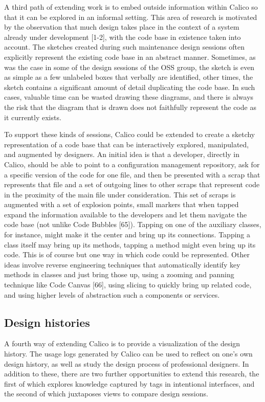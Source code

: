 \documentclass[12pt,fleqn]{ucithesis}
\begin{document}
A third path of extending work is to embed outside information within Calico so that it can be explored in an informal setting. This area of research is motivated by the observation that much design takes place in the context of a system already under development [1-2], with the code base in existence taken into account. The sketches created during such maintenance design sessions often explicitly represent the existing code base in an abstract manner. Sometimes, as was the case in some of the design sessions of the OSS group, the sketch is even as simple as a few unlabeled boxes that verbally are identified, other times, the sketch contains a significant amount of detail duplicating the code base. In such cases, valuable time can be wasted drawing these diagrams, and there is always the risk that the diagram that is drawn does not faithfully represent the code as it currently exists.

To support these kinds of sessions, Calico could be extended to create a sketchy representation of a code base that can be interactively explored, manipulated, and augmented by designers. An initial idea is that a developer, directly in Calico, should be able to point to a configuration management repository, ask for a specific version of the code for one file, and then be presented with a scrap that represents that file and a set of outgoing lines to other scraps that represent code in the proximity of the main file under consideration. This set of scraps is augmented with a set of explosion points, small markers that when tapped expand the information available to the developers and let them navigate the code base (not unlike Code Bubbles [65]). Tapping on one of the auxiliary classes, for instance, might make it the center and bring up its connections. Tapping a class itself may bring up its methods, tapping a method might even bring up its code. This is of course but one way in which code could be represented. Other ideas involve reverse engineering techniques that automatically identify key methods in classes and just bring those up, using a zooming and panning technique like Code Canvas [66], using slicing to quickly bring up related code, and using higher levels of abstraction such a components or services.

\subsection{Design histories}

A fourth way of extending Calico is to provide a visualization of the design history. The usage logs generated by Calico can be used to reflect on one's own design history, as well as study the design process of professional designers. In addition to these, there are two further opportunities to extend this research, the first of which explores knowledge captured by tags in intentional interfaces, and the second of which juxtaposes views to compare design sessions.
\end{document}
